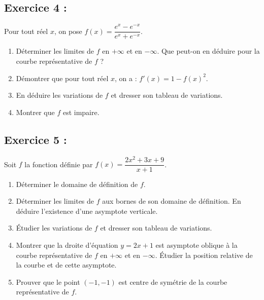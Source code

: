 \documentclass[12pt,a4paper]{article}
\begin{document}
\subsection*{Exercice 4 :}
Pour tout réel $x$, on pose $f(x)=\dfrac{e^x-e^{-x}}{e^x+e^{-x}}$.
\begin{enumerate}
    \item Déterminer les limites de $f$ en $+\infty$ et en $-\infty$. Que peut-on en déduire pour la courbe représentative de $f$ ?
    \item Démontrer que pour tout réel $x$, on a : $f'(x)=1-f(x)^2$.
    \item En déduire les variations de $f$ et dresser son tableau de variations.
    \item Montrer que $f$ est impaire.
\end{enumerate}

\subsection*{Exercice 5 :}
Soit $f$ la fonction définie par $f(x)=\dfrac{2x^2+3x+9}{x+1}$.
\begin{enumerate}
    \item Déterminer le domaine de définition de $f$.
    \item Déterminer les limites de $f$ aux bornes de son domaine de définition. En déduire l'existence d'une asymptote verticale.
    \item Étudier les variations de $f$ et dresser son tableau de variations.
    \item Montrer que la droite d'équation $y=2x+1$ est asymptote oblique à la courbe représentative de $f$ en $+\infty$ et en $-\infty$. Étudier la position relative de la courbe et de cette asymptote.
    \item Prouver que le point $(-1,-1)$ est centre de symétrie de la courbe représentative de $f$.
\end{enumerate}
\end{document}
